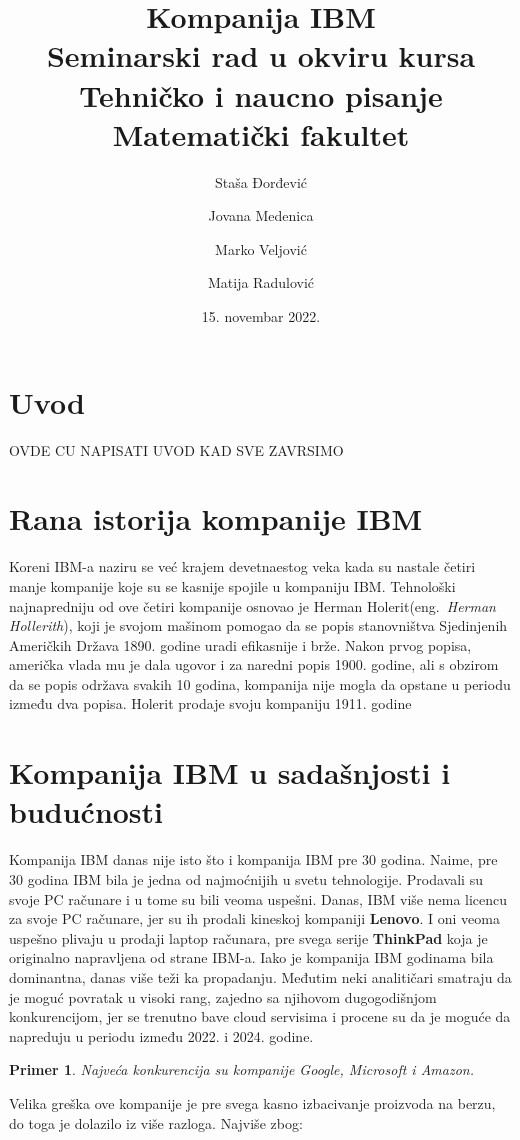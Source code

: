 \documentclass[a4paper]{article}
\title{Kompanija IBM \\
\normalsize Seminarski rad u okviru kursa\\ Tehničko i naucno pisanje
\\Matematički fakultet}
\author{Staša Đorđević \and
Jovana Medenica \and
Marko Veljović \and
Matija Radulović} %
\date{15. novembar 2022.} %
\newtheorem{primer}{Primer}[section]
\begin{document}
\maketitle
\tableofcontents
\section{Uvod}
OVDE CU NAPISATI UVOD KAD SVE ZAVRSIMO %
\section{Rana istorija kompanije IBM}
Koreni IBM-a naziru se već krajem devetnaestog veka kada su nastale četiri manje kompanije koje su se kasnije spojile u kompaniju IBM. Tehnološki najnapredniju od ove četiri kompanije osnovao je Herman Holerit(eng.~{\em Herman Hollerith}), koji je svojom mašinom pomogao da se popis stanovništva Sjedinjenih Američkih Država 1890. godine uradi efikasnije i brže. Nakon prvog popisa, američka vlada mu je dala ugovor i za naredni popis 1900. godine, ali s obzirom da se popis održava svakih 10 godina, kompanija nije mogla da opstane u periodu između dva popisa. Holerit prodaje svoju kompaniju 1911. godine
\section{Kompanija IBM u sadašnjosti i budućnosti}
Kompanija IBM danas nije isto što i kompanija IBM pre 30 godina. Naime, pre 30 godina IBM bila je jedna od najmoćnijih u svetu tehnologije. Prodavali su svoje PC računare i u tome su bili veoma uspešni.
Danas, IBM više nema licencu za svoje PC računare, jer su ih prodali kineskoj kompaniji \textbf{Lenovo}\cite{lit1}. I oni veoma uspešno plivaju u prodaji laptop računara, pre svega serije \textbf{ThinkPad} koja je originalno napravljena od strane IBM-a. Iako je kompanija IBM godinama bila dominantna, danas više teži ka propadanju. Međutim neki analitičari smatraju da je moguć povratak u visoki rang, zajedno sa njihovom dugogodišnjom konkurencijom, jer se trenutno bave cloud servisima i procene su da je moguće da napreduju u periodu između 2022. i 2024. godine.

\begin{primer}
Najveća konkurencija su kompanije Google, Microsoft i Amazon.
\end{primer}

Velika greška ove kompanije je pre svega kasno izbacivanje proizvoda na berzu, do toga je dolazilo iz više razloga. Najviše zbog:
\end{document}
